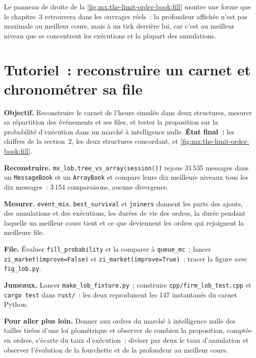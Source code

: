 Le panneau de droite de la \cref{fig:mx:the-limit-order-book:fill} montre une forme que le chapitre~3 retrouvera dans les ouvrages réels~: la profondeur affichée n'est pas maximale au meilleur
cours, mais à un tick derrière lui, car c'est au meilleur niveau que se concentrent les exécutions et la plupart des annulations.

\section{Tutoriel~: reconstruire un carnet et chronométrer sa file}\label{tut:mx:the-limit-order-book:tut}

\begin{tutorial}
\textbf{Objectif.} Reconstruire le carnet de l'heure simulée dans deux structures, mesurer sa répartition des événements et ses files, et tester la
proposition sur la probabilité d'exécution dans un marché à intelligence nulle. \textbf{État final~:} les chiffres de la section~2, les deux structures concordant, et
\cref{fig:mx:the-limit-order-book:fill}.
\begin{tutsteps}
\item \textbf{Reconstruire.} \texttt{mx\_lob.tree\_vs\_array(session())} rejoue 31\,535 messages dans un \texttt{MessageBook} et un \texttt{ArrayBook} et
compare leurs dix meilleurs niveaux tous les dix messages~: 3\,154 comparaisons, aucune divergence.
\item \textbf{Mesurer.} \texttt{event\_mix}, \texttt{best\_survival} et \texttt{joiners} donnent les parts des ajouts, des annulations et des exécutions, les durées de vie
des ordres, la durée pendant laquelle un meilleur cours tient et ce que deviennent les ordres qui rejoignent la meilleure file.
\item \textbf{File.} Évaluer \texttt{fill\_probability} et la comparer à \texttt{queue\_mc}~; lancer \texttt{zi\_market(improve=False)} et
\texttt{zi\_market(improve=True)}~; tracer la figure avec \texttt{fig\_lob.py}.
\item \textbf{Jumeaux.} Lancer \texttt{make\_lob\_fixture.py}~; construire \texttt{cpp/firm\_lob\_test.cpp} et \texttt{cargo test} dans \texttt{rust/}~: les deux reproduisent
les 147 instantanés du carnet Python.
\end{tutsteps}
\textbf{Pour aller plus loin.} Donner aux ordres du marché à intelligence nulle des tailles tirées d'une loi géométrique et observer de combien la proposition, comptée en
ordres, s'écarte du taux d'exécution~; diviser par deux le taux d'annulation et observer l'évolution de la fourchette et de la profondeur au meilleur cours.
\end{tutorial}

